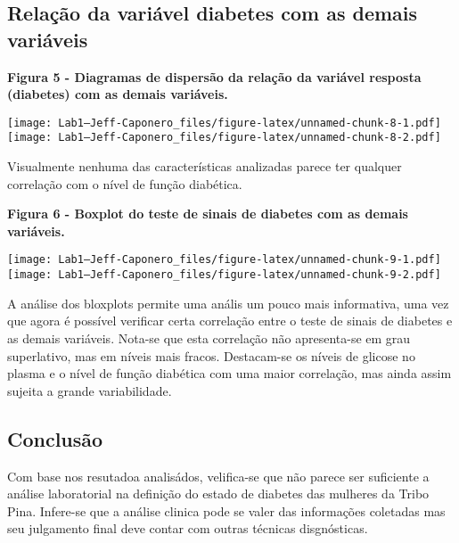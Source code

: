 \documentclass[
]{article}
\begin{document}
\hypertarget{relauxe7uxe3o-da-variuxe1vel-diabetes-com-as-demais-variuxe1veis}{%
\subsection{Relação da variável diabetes com as demais
variáveis}\label{relauxe7uxe3o-da-variuxe1vel-diabetes-com-as-demais-variuxe1veis}}

\newpage

\textbf{Figura 5 - Diagramas de dispersão da relação da variável
resposta (diabetes) com as demais variáveis.}

\texttt{[image: Lab1---Jeff-Caponero\_files/figure-latex/unnamed-chunk-8-1.pdf]}
\texttt{[image: Lab1---Jeff-Caponero\_files/figure-latex/unnamed-chunk-8-2.pdf]}

\newline
\newline

Visualmente nenhuma das características analizadas parece ter qualquer
correlação com o nível de função diabética.

\newpage

\textbf{Figura 6 - Boxplot do teste de sinais de diabetes com as demais
variáveis.}

\texttt{[image: Lab1---Jeff-Caponero\_files/figure-latex/unnamed-chunk-9-1.pdf]}
\texttt{[image: Lab1---Jeff-Caponero\_files/figure-latex/unnamed-chunk-9-2.pdf]}

\newline
\newline

A análise dos bloxplots permite uma anális um pouco mais informativa,
uma vez que agora é possível verificar certa correlação entre o teste de
sinais de diabetes e as demais variáveis. Nota-se que esta correlação
não apresenta-se em grau superlativo, mas em níveis mais fracos.
Destacam-se os níveis de glicose no plasma e o nível de função diabética
com uma maior correlação, mas ainda assim sujeita a grande
variabilidade.

\hypertarget{conclusuxe3o}{%
\subsection{Conclusão}\label{conclusuxe3o}}

Com base nos resutadoa analisádos, velifica-se que não parece ser
suficiente a análise laboratorial na definição do estado de diabetes das
mulheres da Tribo Pina. Infere-se que a análise clinica pode se valer
das informações coletadas mas seu julgamento final deve contar com
outras técnicas disgnósticas.
\end{document}
